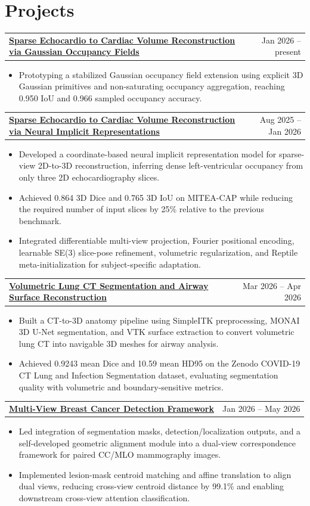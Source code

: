 \documentclass[letterpaper,10pt]{article}
\newcommand{\cvItem}[1]{\item\small{#1}}
\newcommand{\cvProjectHeading}[2]{
  \vspace{2pt}
  \begin{tabularx}{\textwidth}{X r}
    \textbf{#1} & \small #2 \\
  \end{tabularx}
  \vspace{-2pt}
}
\newcommand{\cvItemListStart}{
  \begin{itemize}[leftmargin=0.16in, itemsep=1.5pt, parsep=0pt, topsep=2pt]
}
\newcommand{\cvItemListEnd}{
  \end{itemize}
  \vspace{2pt}
}
\begin{document}
\section{Projects}

\cvProjectHeading
  {\href{https://github.com/tushar-nayak/cardiac-reconstruction-evolved}{Sparse Echocardio to Cardiac Volume Reconstruction via Gaussian Occupancy Fields}}{Jan 2026 -- present}
\cvItemListStart
    \cvItem{Prototyping a stabilized Gaussian occupancy field extension using explicit 3D Gaussian primitives and non-saturating occupancy aggregation, reaching 0.950 IoU and 0.966 sampled occupancy accuracy.}
\cvItemListEnd


\cvProjectHeading
  {\href{https://github.com/tushar-nayak/cardiac-volume-reconstruction}{Sparse Echocardio to Cardiac Volume Reconstruction via Neural Implicit Representations}}{Aug 2025 -- Jan 2026}
\cvItemListStart
  \cvItem{Developed a coordinate-based neural implicit representation model for sparse-view 2D-to-3D reconstruction, inferring dense left-ventricular occupancy from only three 2D echocardiography slices.}
  \cvItem{Achieved 0.864 3D Dice and 0.765 3D IoU on \textsc{MITEA-CAP} while reducing the required number of input slices by 25\% relative to the previous benchmark.}
  \cvItem{Integrated differentiable multi-view projection, Fourier positional encoding, learnable \textsc{SE(3)} slice-pose refinement, volumetric regularization, and Reptile meta-initialization for subject-specific adaptation.}
\cvItemListEnd

\cvProjectHeading
  {\href{https://github.com/tushar-nayak/lungvolseg}{Volumetric Lung CT Segmentation and Airway Surface Reconstruction}}{Mar 2026 -- Apr 2026}
\cvItemListStart
  \cvItem{Built a CT-to-3D anatomy pipeline using SimpleITK preprocessing, MONAI 3D U-Net segmentation, and VTK surface extraction to convert volumetric lung CT into navigable 3D meshes for airway analysis.}
  \cvItem{Achieved 0.9243 mean Dice and 10.59 mean HD95 on the Zenodo COVID-19 CT Lung and Infection Segmentation dataset, evaluating segmentation quality with volumetric and boundary-sensitive metrics.}
\cvItemListEnd

\cvProjectHeading
  {\href{https://github.com/tushar-nayak/grading-cbisddsm}{Multi-View Breast Cancer Detection Framework}}{Jan 2026 -- May 2026}
\cvItemListStart
  \cvItem{Led integration of segmentation masks, detection/localization outputs, and a self-developed geometric alignment module into a dual-view correspondence framework for paired CC/MLO mammography images.}
  \cvItem{Implemented lesion-mask centroid matching and affine translation to align dual views, reducing cross-view centroid distance by 99.1\% and enabling downstream cross-view attention classification.}
\cvItemListEnd
\end{document}
